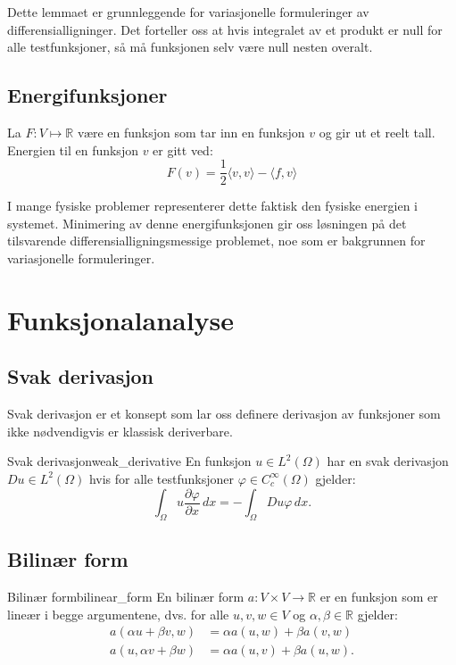 Dette lemmaet er grunnleggende for variasjonelle formuleringer av differensialligninger. Det forteller oss at hvis integralet av et produkt er null for alle testfunksjoner, så må funksjonen selv være null nesten overalt.

\subsection{Energifunksjoner}
La \(F: V \mapsto \mathbb{R}\) være en funksjon som tar inn en funksjon \(v\) og gir ut et reelt tall. Energien til en funksjon \(v\) er gitt ved:
\[
	F(v) = \frac{1}{2} \langle v, v \rangle - \langle f, v \rangle
\]

I mange fysiske problemer representerer dette faktisk den fysiske energien i systemet. Minimering av denne energifunksjonen gir oss løsningen på det tilsvarende differensialligningsmessige problemet, noe som er bakgrunnen for variasjonelle formuleringer.

\section{Funksjonalanalyse}

\subsection{Svak derivasjon}
Svak derivasjon er et konsept som lar oss definere derivasjon av funksjoner som ikke nødvendigvis er klassisk deriverbare.
\begin{definition}{Svak derivasjon}{weak_derivative}
	En funksjon $u \in L^2(\Omega)$ har en svak derivasjon $Du \in L^2(\Omega)$ hvis for alle testfunksjoner $\varphi \in C_c^\infty(\Omega)$ gjelder:
	\[
		\int_\Omega u \frac{\partial \varphi}{\partial x} \, dx = -\int_\Omega Du \varphi \, dx.
	\]
\end{definition}

\subsection{Bilinær form}
\begin{definition}{Bilinær form}{bilinear_form}
	En bilinær form $a: V \times V \to \mathbb{R}$ er en funksjon som er lineær i begge argumentene, dvs. for alle $u,v,w \in V$ og $\alpha, \beta \in \mathbb{R}$ gjelder:
	\begin{align*}
		a(\alpha u + \beta v, w) & = \alpha a(u,w) + \beta a(v,w)  \\
		a(u, \alpha v + \beta w) & = \alpha a(u,v) + \beta a(u,w).
	\end{align*}
\end{definition}

